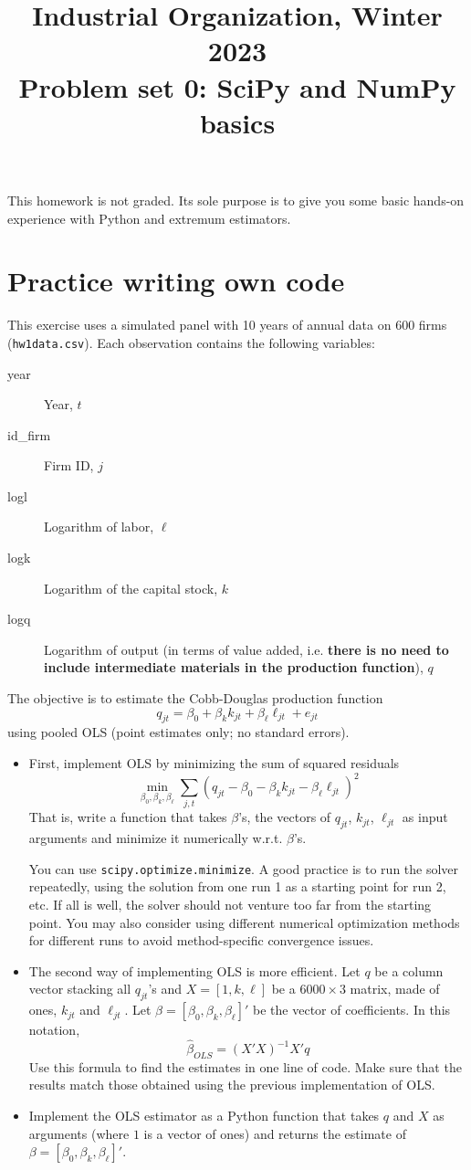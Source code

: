 \documentclass[a4paper, 12pt]{article}
\title{Industrial Organization, Winter 2023\\
Problem set 0: SciPy and NumPy basics}
\date{}
\newcommand{\be}{\begin{equation*}}
\newcommand{\ee}{\end{equation*}}
\begin{document}
\maketitle

This homework is not graded. Its sole purpose is to give you some basic hands-on experience with Python and extremum estimators.


\section*{Practice writing own code}

This exercise uses a simulated panel with 10 years of annual data on 600 firms (\texttt{hw1data.csv}). Each observation contains the following variables:
\begin{description}
	\item[year] Year, $t$
	\item[id\_firm] Firm ID, $j$
	\item[logl] Logarithm of labor, $\ell$
	\item[logk] Logarithm of the capital stock, $k$
	\item[logq] Logarithm of output (in terms of value added, i.e. \textbf{there is no need to include intermediate materials in the production function}), $q$
\end{description}

The objective is to estimate the Cobb-Douglas production function
	\be
		q_{jt} = \beta_0 + \beta_kk_{jt} + \beta_\ell\ell_{jt} + e_{jt}
	\ee
	using pooled OLS (point estimates only; no standard errors).
\begin{itemize}	
	\item{First, implement OLS by minimizing the sum of squared residuals
	\be
		\min_{\beta_0, \beta_k, \beta_\ell}\sum_{j,t}\left(q_{jt} - \beta_0 - \beta_kk_{jt} - \beta_\ell\ell_{jt} \right)^2
	\ee
	That is, write a function that takes $\beta$'s, the vectors of $q_{jt}$, $k_{jt}$, $\ell_{jt}$ as input arguments and minimize it numerically w.r.t. $\beta$'s.
	
	You can use \texttt{scipy.optimize.minimize}. A good practice is to run the solver repeatedly, using the solution from one run 1 as a starting point for run 2, etc. If all is well, the solver should not venture too far from the starting point. You may also consider using different numerical optimization methods for different runs to avoid method-specific convergence issues.}

	\item{The second way of implementing OLS is more efficient. Let $q$ be a column vector stacking all $q_{jt}$'s and $X = [1, k, \ell]$ be a $6000\times{3}$ matrix, made of ones, $k_{jt}$ and $\ell_{jt}$. Let $\beta = [\beta_0, \beta_k, \beta_\ell]'$ be the vector of coefficients. In this notation,
	\be
		\widehat\beta_{OLS} = \left(X'X\right)^{-1}X'q
	\ee
	Use this formula to find the estimates in one line of code. Make sure that the results match those obtained using the previous implementation of OLS.}
	\item{Implement the OLS estimator as a Python function that takes $q$ and $X$ as arguments (where $1$ is a vector of ones) and returns the estimate of $\beta = [\beta_0, \beta_k, \beta_\ell]'$.}
\end{itemize}
\end{document}
